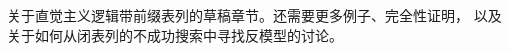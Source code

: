 \documentclass[../../../include/open-logic-chapter]{subfiles}
\begin{document}

\begin{editorial}
  关于直觉主义逻辑带前缀表列的草稿章节。还需要更多例子、完全性证明，
  以及关于如何从闭表列的不成功搜索中寻找反模型的讨论。
\end{editorial}


\OLEndChapterHook
\end{document}
